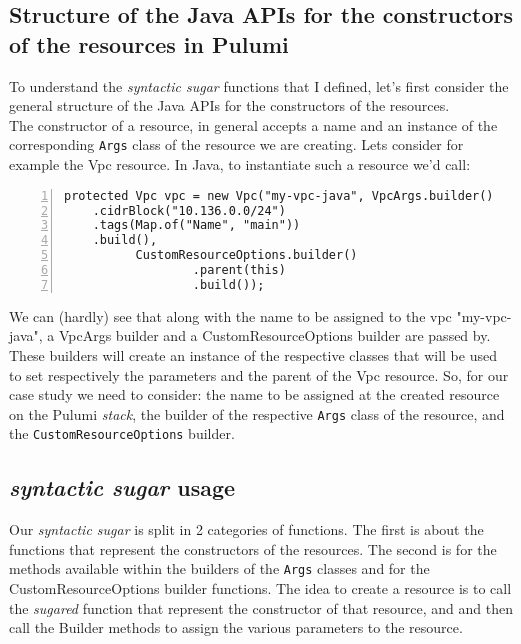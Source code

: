 \subsection{Structure of the Java APIs for the constructors of the resources in Pulumi}
To understand the \textit{syntactic sugar} functions that I defined, let's first consider the general structure of the Java APIs for the constructors of the resources.\\
The constructor of a resource, in general accepts a name and an instance of the corresponding \texttt{Args} class of the resource we are creating.
Lets consider for example the Vpc resource.
In Java, to instantiate such a resource we'd call:\\
\begin{minipage}{\linewidth}
\begin{lstlisting}[numbers=left, numberstyle=\tiny, numbersep=-5pt, stepnumber=1]
  protected Vpc vpc = new Vpc("my-vpc-java", VpcArgs.builder()
    .cidrBlock("10.136.0.0/24")
    .tags(Map.of("Name", "main"))
    .build(),
          CustomResourceOptions.builder()
                  .parent(this)
                  .build());
\end{lstlisting}
\end{minipage}
We can (hardly) see that along with the name to be assigned to the vpc "my-vpc-java", a VpcArgs builder and a CustomResourceOptions builder are passed by.
These builders will create an instance of the respective classes that will be used to set respectively the parameters and the parent of the Vpc resource.
So, for our case study we need to consider: the name to be assigned at the created resource on the Pulumi \textit{stack}, the builder of the respective \texttt{Args} class of the resource, and the \texttt{CustomResourceOptions} builder.


\subsection{\textit{syntactic sugar} usage}
\label{ssec:syn-sug-usage}
Our \textit{syntactic sugar} is split in 2 categories of functions.
The first is about the functions that represent the constructors of the resources.
The second is for the methods available within the builders of the \texttt{Args} classes and for the CustomResourceOptions builder functions.
The idea to create a resource is to call the \textit{sugared} function that represent the constructor of that resource, and and then call the Builder methods to assign the various parameters to the resource.

